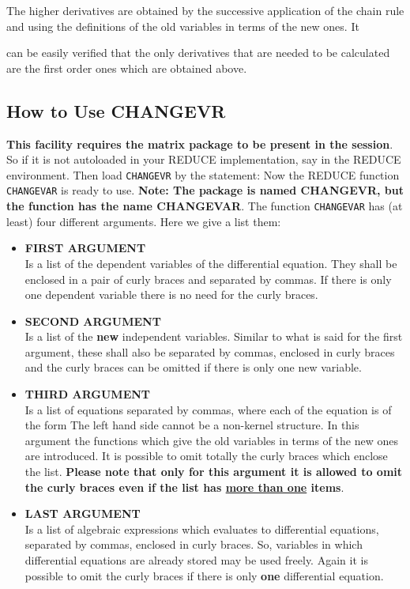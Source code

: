 The higher derivatives are obtained by the successive application of the chain
rule and using the definitions of the old variables in terms of the new ones. It

can be easily verified that the only derivatives that are needed to be
calculated are the first order ones which are obtained above.

\subsection{How to Use CHANGEVR}
{\bf This facility requires the matrix package to be present in the session}.
So if it is not autoloaded in your REDUCE implementation, say
in the REDUCE environment. Then load {\tt CHANGEVR} by the statement:
Now the REDUCE function {\tt CHANGEVAR} is ready to use. {\bf Note:  The
package is named CHANGEVR, but the function has the name CHANGEVAR}.  The
function {\tt CHANGEVAR} has (at least) four different arguments.  Here we
give a list them:
\begin{itemize}
\item {\bf FIRST ARGUMENT} \\
     Is a list of the dependent variables of the differential equation.
     They shall be enclosed in a pair of curly braces and separated by commas.
     If there is only one dependent variable there is no need for the curly
     braces.
\item {\bf SECOND ARGUMENT}  \\
     Is a list of the {\bf new} independent variables. Similar to what is said
     for the first argument, these shall also be separated by commas,
     enclosed in curly braces and the curly braces can be omitted if there is
     only one new variable.
\item {\bf THIRD ARGUMENT}  \\
     Is a list of equations separated by commas, where each of the equation
     is of the form
     The left hand side cannot be a non-kernel structure. In this argument
     the functions which give the old variables in terms of the new ones are
     introduced. It is possible to omit totally the curly braces which enclose
     the list. {\bf Please note that only for this argument it is allowed to
     omit the curly braces even if the list has \underline{more than one}
     items}.
\item {\bf LAST ARGUMENT}  \\
     Is a list of algebraic expressions which evaluates to  differential
     equations, separated by commas, enclosed in curly braces.
     So, variables in which differential equations are already stored may be
     used freely. Again it is possible to omit the curly braces if there is
     only {\bf one} differential equation.
\end{itemize}

